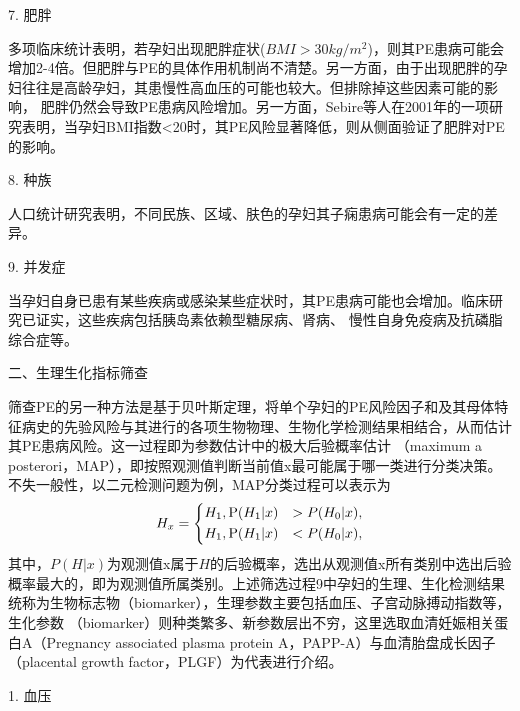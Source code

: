 7. 肥胖

多项临床统计表明，若孕妇出现肥胖症状($BMI>30kg/m^2$)，则其PE患病可能会增加2-4倍\cite{Williams2011,FIGO,Zintzaras2006}。但肥胖与PE的具体作用机制尚不清楚。另一方面，由于出现肥胖的孕妇往往是高龄孕妇，其患慢性高血压的可能也较大。但排除掉这些因素可能的影响，
肥胖仍然会导致PE患病风险增加\cite{Duckitt2005}。另一方面，Sebire等人\cite{Sebire2001}在2001年的一项研究表明，当孕妇BMI指数<20时，其PE风险显著降低，则从侧面验证了肥胖对PE的影响。

8. 种族

人口统计研究表明，不同民族、区域、肤色的孕妇其子痫患病可能会有一定的差异\cite{Ghosh2014,Khalil2013}。

9. 并发症

当孕妇自身已患有某些疾病或感染某些症状时，其PE患病可能也会增加\cite{FIGO,Ray2016,OAG9}。临床研究已证实，这些疾病包括胰岛素依赖型糖尿病\cite{Lee2000,Garner1990}、肾病\cite{Martinell1990}、
慢性自身免疫病\cite{Stamilio2000}及抗磷脂综合症\cite{Dreyfus2001,Marchetti2016}等。

二、生理生化指标筛查

筛查PE的另一种方法是基于贝叶斯定理，将单个孕妇的PE风险因子和及其母体特征病史的先验风险与其进行的各项生物物理、生物化学检测结果相结合，从而估计其PE患病风险\cite{FIGO}。这一过程即为参数估计中的极大后验概率估计
（maximum a posterori，MAP），即按照观测值判断当前值x最可能属于哪一类进行分类决策\cite{Qiu2012}。不失一般性，以二元检测问题为例，MAP分类过程可以表示为
\begin{equation}
    \label{equ:maxap}
    H_{x}=
    \left \{
    \begin{aligned}
        &H_{1}, \text P(H_{1}|x)&>P(H_{0}|x), \\
        &H_{1}, \text P(H_{1}|x)&<P(H_{0}|x),
    \end{aligned}
    \right.  
\end{equation}
其中，$P(H|x)$为观测值x属于$H$的后验概率，选出从观测值x所有类别中选出后验概率最大的，即为观测值所属类别。上述筛选过程9中孕妇的生理、生化检测结果统称为生物标志物（biomarker），生理参数主要包括血压、子宫动脉搏动指数等，生化参数
（biomarker）则种类繁多、新参数层出不穷\cite{Rene2008,Zhong2015,Zeisler2016,Rana2012}，这里选取血清妊娠相关蛋白A（Pregnancy associated plasma protein A，PAPP-A）与血清胎盘成长因子（placental growth factor，PLGF）为代表进行介绍。

1. 血压

